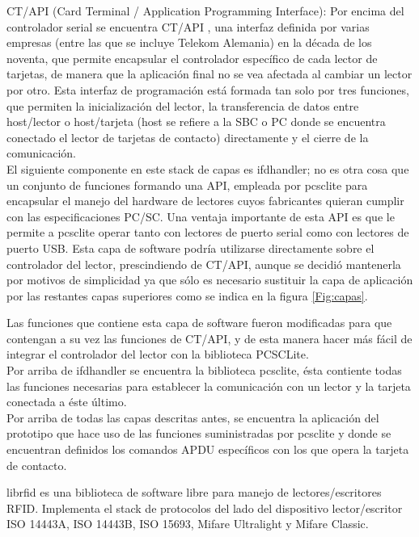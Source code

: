 \documentclass[%
        final,
        notitlepage,
        narroweqnarray,
        inline,
        ]{ieee}
\begin{document}
CT/API (Card Terminal / Application Programming Interface):
Por encima del controlador serial se encuentra CT/API \cite{ctapi}, una interfaz definida por varias empresas (entre las que se incluye Telekom Alemania) en la década de los noventa, que permite encapsular el controlador específico de cada lector de tarjetas, de manera que la aplicación final no se vea afectada al cambiar un lector por otro.
Esta interfaz de programación está formada tan solo por tres funciones, que permiten la inicialización del lector, la transferencia de datos entre host/lector o host/tarjeta (host se refiere a la SBC o PC donde se encuentra conectado el lector de tarjetas de contacto) directamente y el cierre de la comunicación.\\


El siguiente componente en este stack de capas es ifdhandler; no es otra cosa que un conjunto de funciones formando una API, empleada por pcsclite para encapsular el manejo del hardware de lectores cuyos fabricantes quieran cumplir con las especificaciones PC/SC. Una ventaja importante de esta API es que le permite a pcsclite operar tanto con lectores de puerto serial como con lectores de puerto USB.
Esta capa de software podría utilizarse directamente sobre el controlador del lector, prescindiendo de CT/API, aunque se decidió mantenerla por motivos de simplicidad ya que sólo es necesario sustituir la capa de aplicación por las restantes capas superiores como se indica en la figura \ref{Fig:capas}.


Las funciones que contiene esta capa de software fueron modificadas para que contengan a su vez las funciones de CT/API, y de esta manera hacer más fácil de integrar el controlador del lector con la biblioteca PCSCLite.\\


Por arriba de ifdhandler se encuentra la biblioteca pcsclite, ésta contiente todas las funciones necesarias para establecer la comunicación con un lector y la tarjeta conectada a éste último.\\


Por arriba de todas las capas descritas antes, se encuentra la aplicación del prototipo que hace uso de las funciones suministradas por pcsclite y donde se encuentran definidos los comandos APDU específicos con los que opera la tarjeta de contacto.

\newpage
{}
librfid es una biblioteca de software libre para manejo de lectores/escritores RFID. Implementa el stack de protocolos del lado del dispositivo lector/escritor ISO 14443A, ISO 14443B, ISO 15693, Mifare Ultralight y Mifare Classic.
\end{document}
